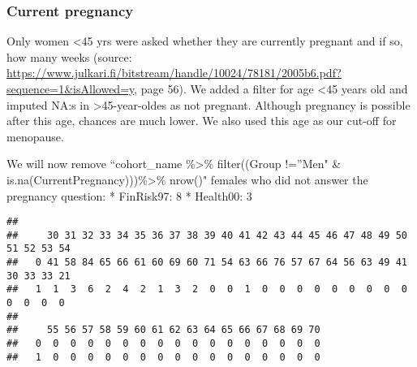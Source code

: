 \documentclass[
]{article}
\newenvironment{Shaded}{\begin{snugshade}}{\end{snugshade}}
\newcommand{\CommentTok}[1]{\textcolor[rgb]{0.56,0.35,0.01}{\textit{#1}}}
\newcommand{\FunctionTok}[1]{\textcolor[rgb]{0.00,0.00,0.00}{#1}}
\newcommand{\NormalTok}[1]{#1}
\newcommand{\OtherTok}[1]{\textcolor[rgb]{0.56,0.35,0.01}{#1}}
\newcommand{\SpecialCharTok}[1]{\textcolor[rgb]{0.00,0.00,0.00}{#1}}
\newcommand{\StringTok}[1]{\textcolor[rgb]{0.31,0.60,0.02}{#1}}
\begin{document}
\hypertarget{current-pregnancy}{%
\subsubsection{Current pregnancy}\label{current-pregnancy}}

Only women \textless45 yrs were asked whether they are currently
pregnant and if so, how many weeks (source:
\url{https://www.julkari.fi/bitstream/handle/10024/78181/2005b6.pdf?sequence=1\&isAllowed=y},
page 56). We added a filter for age \textless45 years old and imputed
NA:s in \textgreater45-year-oldes as not pregnant. Although pregnancy is
possible after this age, chances are much lower. We also used this age
as our cut-off for menopause.

We will now remove ``cohort\_name \%\textgreater\% filter((Group
!=''Men" \& is.na(CurrentPregnancy)))\%\textgreater\% nrow()" females
who did not answer the pregnancy question: * FinRisk97: 8 * Health00: 3

\begin{Shaded}
\end{Shaded}

\begin{verbatim}
##    
##     30 31 32 33 34 35 36 37 38 39 40 41 42 43 44 45 46 47 48 49 50 51 52 53 54
##   0 41 58 84 65 66 61 60 69 60 71 54 63 66 76 57 67 64 56 63 49 41 30 33 33 21
##   1  1  3  6  2  4  2  1  3  2  0  0  1  0  0  0  0  0  0  0  0  0  0  0  0  0
##    
##     55 56 57 58 59 60 61 62 63 64 65 66 67 68 69 70
##   0  0  0  0  0  0  0  0  0  0  0  0  0  0  0  0  0
##   1  0  0  0  0  0  0  0  0  0  0  0  0  0  0  0  0
\end{verbatim}
\end{document}
